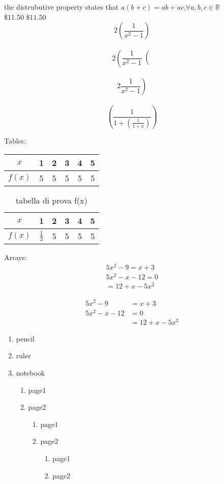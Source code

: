 \documentclass{article}
\begin{document}
the distrubutive property states that
$a(b+c) = ab+ac $,$  \forall a,b,c \in \mathbb{R}$\\
\$11.50 $\$11.50$\\
$$2\left(\frac{1}{x^2-1}\right)$$\\
$$2\left(\frac{1}{x^2-1}\right($$\\
$$2\left.\frac{1}{x^2-1}\right)$$\\
$$\left(\frac{1}{1+\left(\frac{1}{1+x}\right)}\right)$$


Tables:\\

\begin{tabular}{|c||c|c|c|c|c|}
\hline $x$&1&2&3&4&5\\\hline
$f(x)$&5&5&5&5&5\\\hline
\end{tabular}

\begin{table}[H]
\def\arraystretch{1.5}
\centering
\begin{tabular}{|c||c|c|c|c|c|}
\hline $x$&1&2&3&4&5\\\hline
$f(x)$&$\frac{1}{2}$&5&5&5&5\\\hline
\end{tabular}
\caption{tabella di prova f(x)}
\end{table}



Arrays:\\

\begin{align}
5x^2-9=x+3\\
5x^2-x-12=0\\
=12+x-5x^2
\end{align}


\begin{align*}
5x^2-9&=x+3\\
5x^2-x-12&=0\\
&=12+x-5x^2
\end{align*}

\newpage
\begin{enumerate}
\item pencil
\item ruler
\item notebook
\begin{enumerate}
\item page1
\item page2
\begin{enumerate}
\item page1
\item page2
\begin{enumerate}
\item page1
\item page2
\end{enumerate}
\end{enumerate}
\end{enumerate}
\end{enumerate}
\end{document}
